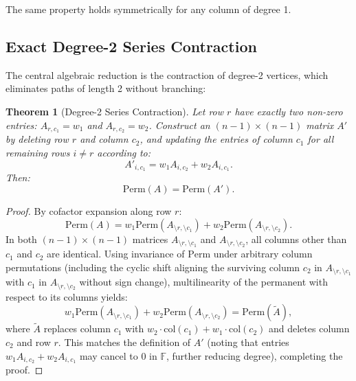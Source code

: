 \documentclass[11pt,a4paper]{article}
\newtheorem{theorem}{Theorem}[section]
\theoremstyle{definition}
\newcommand{\Perm}{\mathrm{Perm}}
\newcommand{\F}{\mathbb{F}}
\begin{document}
The same property holds symmetrically for any column of degree 1.

\subsection{Exact Degree-2 Series Contraction}

The central algebraic reduction is the contraction of degree-2 vertices, which eliminates paths of length 2 without branching:

\begin{theorem}[Degree-2 Series Contraction]
\label{thm:deg2_contraction}
Let row $r$ have exactly two non-zero entries: $A_{r, c_1} = w_1$ and $A_{r, c_2} = w_2$. Construct an $(n-1) \times (n-1)$ matrix $A'$ by deleting row $r$ and column $c_2$, and updating the entries of column $c_1$ for all remaining rows $i \neq r$ according to:
\begin{equation}
A'_{i, c_1} = w_1 A_{i, c_2} + w_2 A_{i, c_1}.
\end{equation}
Then:
\begin{equation}
\Perm(A) = \Perm(A').
\end{equation}
\end{theorem}

\begin{proof}
By cofactor expansion along row $r$:
\begin{equation}
\Perm(A) = w_1 \Perm(A_{\setminus r, \setminus c_1}) + w_2 \Perm(A_{\setminus r, \setminus c_2}).
\end{equation}
In both $(n-1) \times (n-1)$ matrices $A_{\setminus r, \setminus c_1}$ and $A_{\setminus r, \setminus c_2}$, all columns other than $c_1$ and $c_2$ are identical. Using invariance of $\Perm$ under arbitrary column permutations (including the cyclic shift aligning the surviving column $c_2$ in $A_{\setminus r, \setminus c_1}$ with $c_1$ in $A_{\setminus r, \setminus c_2}$ without sign change), multilinearity of the permanent with respect to its columns yields:
\begin{equation}
w_1 \Perm(A_{\setminus r, \setminus c_1}) + w_2 \Perm(A_{\setminus r, \setminus c_2}) = \Perm(\tilde{A}),
\end{equation}
where $\tilde{A}$ replaces column $c_1$ with $w_2 \cdot \mathrm{col}(c_1) + w_1 \cdot \mathrm{col}(c_2)$ and deletes column $c_2$ and row $r$. This matches the definition of $A'$ (noting that entries $w_1 A_{i,c_2} + w_2 A_{i,c_1}$ may cancel to $0$ in $\F$, further reducing degree), completing the proof.
\end{proof}
\end{document}
